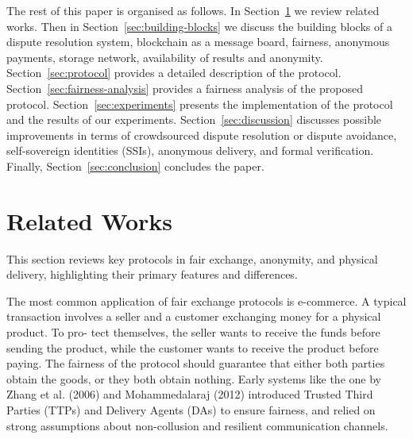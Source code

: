 \documentclass[pdftex,twocolumn,epjc3]{svjour3}
\begin{document}
\begin{sloppypar}
The rest of this paper is organised as follows. In Section~\ref{sec:related-works} we review related works. 
Then in Section~\ref{sec:building-blocks} we discuss the building blocks of a dispute resolution system, blockchain as a message board, fairness, anonymous payments, storage network, availability of results and anonymity.
Section~\ref{sec:protocol} provides a detailed description of the protocol.
Section~\ref{sec:fairness-analysis} provides a fairness analysis of the proposed protocol.
Section~\ref{sec:experiments} presents the implementation of the protocol and the results of our experiments.
Section~\ref{sec:discussion} discusses possible improvements in terms of crowdsourced dispute resolution or dispute avoidance, self-sovereign identities (SSIs), anonymous delivery, and formal verification.
Finally, Section~\ref{sec:conclusion} concludes the paper.
\end{sloppypar}


\section{Related Works}\label{sec:related-works}
\begin{sloppypar}
This section reviews key protocols in fair exchange, anonymity, and physical delivery, highlighting their primary features and differences.
\end{sloppypar}

The most common application of fair exchange protocols
is e-commerce. A typical transaction involves a seller and
a customer exchanging money for a physical product. To pro-
tect themselves, the seller wants to receive the funds before
sending the product, while the customer wants to receive the
product before paying. The fairness of the protocol should
guarantee that either both parties obtain the goods, or they
both obtain nothing.
Early systems like the one by Zhang et al. (2006)\cite{zhangPracticalFairExchangeEPayment2006} and Mohammedalaraj (2012)\cite{mohammedalarajFairnessPhysicalProducts2012} introduced Trusted Third Parties (TTPs) and Delivery Agents (DAs) to ensure fairness, and relied on strong assumptions about non-collusion and resilient communication channels.
\end{document}
